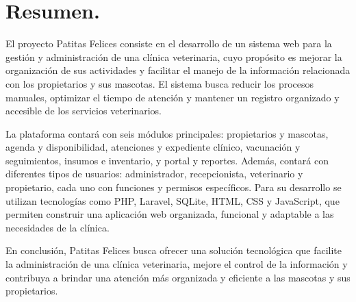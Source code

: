 \section*{Resumen.}

El proyecto Patitas Felices consiste en el desarrollo de un sistema web para la gestión y administración de una clínica veterinaria, cuyo propósito es mejorar la organización de sus actividades y facilitar el manejo de la información relacionada con los propietarios y sus mascotas. El sistema busca reducir los procesos manuales, optimizar el tiempo de atención y mantener un registro organizado y accesible de los servicios veterinarios.

La plataforma contará con seis módulos principales: propietarios y mascotas, agenda y disponibilidad, atenciones y expediente clínico, vacunación y seguimientos, insumos e inventario, y portal y reportes. Además, contará con diferentes tipos de usuarios: administrador, recepcionista, veterinario y propietario, cada uno con funciones y permisos específicos. Para su desarrollo se utilizan tecnologías como PHP, Laravel, SQLite, HTML, CSS y JavaScript, que permiten construir una aplicación web organizada, funcional y adaptable a las necesidades de la clínica.

En conclusión, Patitas Felices busca ofrecer una solución tecnológica que facilite la administración de una clínica veterinaria, mejore el control de la información y contribuya a brindar una atención más organizada y eficiente a las mascotas y sus propietarios.

